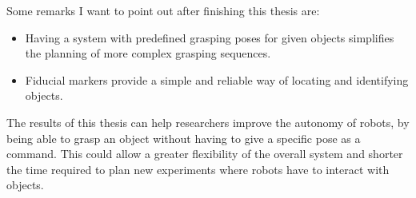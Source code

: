 Some remarks I want to point out after finishing this thesis are:
\begin{itemize}
	\item Having a system with predefined grasping poses for given objects simplifies the planning of more complex grasping sequences.
	\item Fiducial markers provide a simple and reliable way of locating and identifying objects.
\end{itemize}

The results of this thesis can help researchers improve the autonomy of robots, by being able to grasp an object without having to give a specific pose as a command. This could allow a greater flexibility of the overall system and shorter the time required to plan new experiments where robots have to interact with objects.
%
%
%
%

